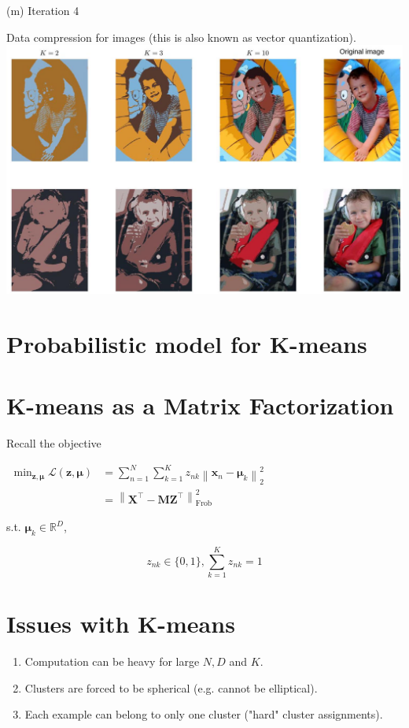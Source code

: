 \documentclass[10pt]{article}
\begin{document}
(m) Iteration 4

Data compression for images (this is also known as vector quantization).
\includegraphics[max width=\textwidth, center]{2023_12_30_43b7e6c218cb987b5fcag-7}

\section*{Probabilistic model for K-means}
\section*{K-means as a Matrix Factorization}
Recall the objective

$\begin{aligned} \min _{\mathbf{z}, \boldsymbol{\mu}} \mathcal{L}(\mathbf{z}, \boldsymbol{\mu}) & =\sum_{n=1}^{N} \sum_{k=1}^{K} z_{n k}\left\|\mathbf{x}_{n}-\boldsymbol{\mu}_{k}\right\|_{2}^{2} \\ & =\left\|\mathbf{X}^{\top}-\mathbf{M} \mathbf{Z}^{\top}\right\|_{\text {Frob }}^{2}\end{aligned}$

s.t. $\boldsymbol{\mu}_{k} \in \mathbb{R}^{D}$,

$$
z_{n k} \in\{0,1\}, \sum_{k=1}^{K} z_{n k}=1
$$

\section*{Issues with K-means}
\begin{enumerate}
  \item Computation can be heavy for large $N, D$ and $K$.

  \item Clusters are forced to be spherical (e.g. cannot be elliptical).

  \item Each example can belong to only one cluster ("hard" cluster assignments).

\end{enumerate}
\end{document}
